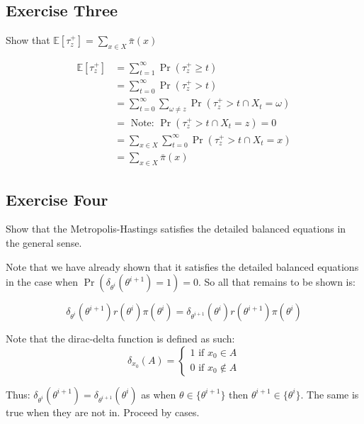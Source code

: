 \documentclass[12pt]{paper}
\newcommand{\exV}[1]{\mathbb{E} \left [ #1 \right ]}
\begin{document}
\subsection{Exercise Three}
\label{sec:orgab5ca7a}

Show that $\exV{\tau_z^+} = \sum_{x\in X} \bar{\pi}(x)$
\vspace{.3in}

\begin{align*}
  \exV{\tau_z^+} &= \sum_{t = 1}^{\infty}  \Pr ( \tau_z^+ \geq t)\\
              &= \sum_{t=0}^{\infty} \Pr( \tau_z^+ > t)\\
              &= \sum_{t=0}^{\infty} \sum_{\omega \neq z} \Pr( \tau_z^+ > t \cap X_t = \omega)\\
              &= \text{ Note:  } \Pr( \tau_z^+ > t \cap X_t = z) = 0\\
              &= \sum_{x \in X} \sum_{t=0}^{\infty} \Pr( \tau_z^+ > t \cap X_t = x)\\
              &= \sum_{x \in X} \bar{\pi}(x)
\end{align*}


\subsection{Exercise Four}
\label{sec:org7130e01}
Show that the Metropolis-Hastings satisfies the detailed balanced
equations in the general sense.
\vspace{.3in}

Note that we have already shown that it satisfies the detailed
balanced equations in the case when $\Pr( \delta_{\theta^i}(\theta^{i+1}) = 1) =
0$. So all that remains to be shown is:

\begin{equation*}
  \delta_{\theta^i}(\theta^{i+1}) r(\theta^i) \pi( \theta^i) = \delta_{\theta^{i+1}}(\theta^i) r(\theta^{i+1}) \pi( \theta^i)
\end{equation*}

Note that the dirac-delta function is defined as such:
\begin{equation*}
  \delta_{x_0}(A) =
  \begin{cases}
    1 \text{ if } x_0 \in A\\
    0 \text{ if } x_0 \notin A
  \end{cases}
\end{equation*}

Thus: $\delta_{\theta^i}(\theta^{i+1}) = \delta_{\theta^{i+1}}(\theta^i)$ as when $\theta \in \{\theta^{i+1}\}$
then $\theta^{i+1} \in \{\theta^i\}$. The same is true when they are not
in. Proceed by cases.
\end{document}
